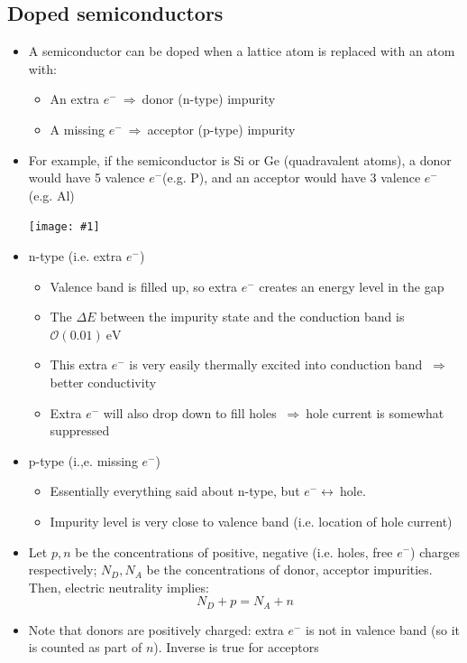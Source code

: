 \documentclass[11pt]{article}
\newcommand{\ev}{\text{eV}}
\newcommand{\el}{\ensuremath{e^{-}}\xspace}
\newcommand{\ord}[1]{\ensuremath{\mathcal{O}(#1)}}
\newcommand{\thus}{$~\Rightarrow~$}
\newcommand{\embedimgw}[2]{\begin{center}\texttt{[image: \#1]}\end{center}}
\begin{document}
\subsection{Doped semiconductors}
\begin{itemize}
  \item A semiconductor can be doped when a lattice atom is replaced with an atom with:
  \begin{itemize}
    \item An extra \el \thus donor (n-type) impurity
    \item A missing \el \thus acceptor (p-type) impurity
  \end{itemize}
  \item For example, if the semiconductor is Si or Ge (quadravalent atoms), a donor would have 5 valence \el (e.g. P), and an acceptor would have 3 valence \el (e.g. Al)
  \embedimgw{figs/doping.png}{.8}
  \item n-type (i.e. extra \el)
  \begin{itemize}
    \item Valence band is filled up, so extra \el creates an energy level in the gap
    \item The $\Delta E$ between the impurity state and the conduction band is $\ord{0.01}~\ev$
    \item This extra \el is very easily thermally excited into conduction band \thus better conductivity
    \item Extra \el will also drop down to fill holes \thus hole current is somewhat suppressed
  \end{itemize}
  \item p-type (i.,e. missing \el)
  \begin{itemize}
    \item Essentially everything said about n-type, but $\el \longleftrightarrow~$hole.
    \item Impurity level is very close to valence band (i.e. location of hole current)
  \end{itemize}
  \item Let $p,n$ be the concentrations of positive, negative (i.e. holes, free \el) charges respectively; $N_D,N_A$ be the concentrations of donor, acceptor impurities. Then, electric neutrality implies:
  \begin{equation}
    N_D+p = N_A+n
  \end{equation}
  \item Note that donors are positively charged: extra \el is not in valence band (so it is counted as part of $n$). Inverse is true for acceptors
\end{itemize}
\end{document}
